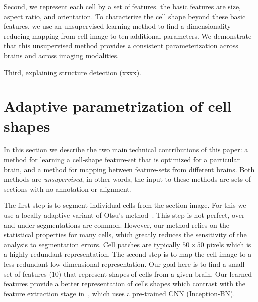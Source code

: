 \documentclass[runningheads]{llncs}
\begin{document}
Second, we represent each cell by a set of features. the basic 
features are size, aspect ratio, and orientation. To characterize the
cell shape beyond these basic features, we use an unsupervised
learning method to find a dimensionality reducing mapping from cell
image to ten additional parameters. We demonstrate that this
unsupervised method provides a consistent parameterization across
brains and across imaging modalities.

Third, explaining structure detection (xxxx).



\section{Adaptive parametrization of cell shapes}
\label{sec:DM}
In this section we describe the two main technical contributions of this
paper: a method for learning a cell-shape feature-set that is optimized
for a particular brain, and a method for mapping between feature-sets
from different brains. Both methods are {\em unsupervised}, in other
words, the input to these methods are sets of sections with no
annotation or alignment.

The first step is to segment individual cells from the section
image. For this we use a locally adaptive variant of
Otsu's method~\cite{otsu1979threshold}. This step is not perfect, over and under segmentations are
common. However, our method relies on the statistical properties for
many cells, which greatly reduces the sensitivity of the analysis to
segmentation errors. 
Cell patches are typically $50\times 50$ pixels which is a highly
redundant representation. The second step is to
map the cell image to a less redundant low-dimensional representation. Our goal here
is to find a small set of features (10) that represent shapes of cells
from a given brain. Our learned features provide a better representation 
of cells shapes which contrast with the feature extraction stage in~\cite{chen2019active}, 
which uses a pre-trained CNN (Inception-BN). 
\end{document}
